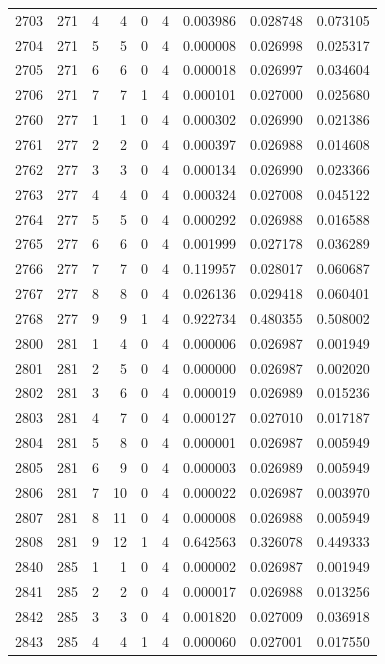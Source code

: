 \begin{longtable}{rrrrrrrrr}
2703 & 271 & 4 & 4 & 0 & 4 & 0.003986 & 0.028748 & 0.073105 \\
2704 & 271 & 5 & 5 & 0 & 4 & 0.000008 & 0.026998 & 0.025317 \\
2705 & 271 & 6 & 6 & 0 & 4 & 0.000018 & 0.026997 & 0.034604 \\
2706 & 271 & 7 & 7 & 1 & 4 & 0.000101 & 0.027000 & 0.025680 \\
2760 & 277 & 1 & 1 & 0 & 4 & 0.000302 & 0.026990 & 0.021386 \\
2761 & 277 & 2 & 2 & 0 & 4 & 0.000397 & 0.026988 & 0.014608 \\
2762 & 277 & 3 & 3 & 0 & 4 & 0.000134 & 0.026990 & 0.023366 \\
2763 & 277 & 4 & 4 & 0 & 4 & 0.000324 & 0.027008 & 0.045122 \\
2764 & 277 & 5 & 5 & 0 & 4 & 0.000292 & 0.026988 & 0.016588 \\
2765 & 277 & 6 & 6 & 0 & 4 & 0.001999 & 0.027178 & 0.036289 \\
2766 & 277 & 7 & 7 & 0 & 4 & 0.119957 & 0.028017 & 0.060687 \\
2767 & 277 & 8 & 8 & 0 & 4 & 0.026136 & 0.029418 & 0.060401 \\
2768 & 277 & 9 & 9 & 1 & 4 & 0.922734 & 0.480355 & 0.508002 \\
2800 & 281 & 1 & 4 & 0 & 4 & 0.000006 & 0.026987 & 0.001949 \\
2801 & 281 & 2 & 5 & 0 & 4 & 0.000000 & 0.026987 & 0.002020 \\
2802 & 281 & 3 & 6 & 0 & 4 & 0.000019 & 0.026989 & 0.015236 \\
2803 & 281 & 4 & 7 & 0 & 4 & 0.000127 & 0.027010 & 0.017187 \\
2804 & 281 & 5 & 8 & 0 & 4 & 0.000001 & 0.026987 & 0.005949 \\
2805 & 281 & 6 & 9 & 0 & 4 & 0.000003 & 0.026989 & 0.005949 \\
2806 & 281 & 7 & 10 & 0 & 4 & 0.000022 & 0.026987 & 0.003970 \\
2807 & 281 & 8 & 11 & 0 & 4 & 0.000008 & 0.026988 & 0.005949 \\
2808 & 281 & 9 & 12 & 1 & 4 & 0.642563 & 0.326078 & 0.449333 \\
2840 & 285 & 1 & 1 & 0 & 4 & 0.000002 & 0.026987 & 0.001949 \\
2841 & 285 & 2 & 2 & 0 & 4 & 0.000017 & 0.026988 & 0.013256 \\
2842 & 285 & 3 & 3 & 0 & 4 & 0.001820 & 0.027009 & 0.036918 \\
2843 & 285 & 4 & 4 & 1 & 4 & 0.000060 & 0.027001 & 0.017550 \\

\end{longtable}
